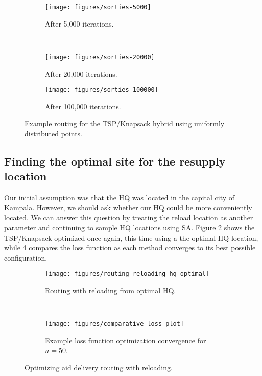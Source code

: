 \documentclass{article} %
\begin{document}
\begin{figure}[H]
  \centering
  \begin{subfigure}[b]{0.5\textwidth}
    \centering
    \texttt{[image: figures/sorties-5000]}
    \caption{After 5,000 iterations.}
  \end{subfigure}~\begin{subfigure}[b]{0.5\textwidth}
    \centering
    \texttt{[image: figures/sorties-20000]}
    \caption{After 20,000 iterations.}
  \end{subfigure}
  \begin{subfigure}[b]{\textwidth}
    \centering
    \texttt{[image: figures/sorties-100000]}
    \caption{After 100,000 iterations.}
  \end{subfigure}
  \caption{Example routing for the TSP/Knapsack hybrid using uniformly distributed points.}
  \label{fig:sorties}
\end{figure}

\subsection{Finding the optimal site for the resupply location}

Our initial assumption was that the HQ was located in the capital city of Kampala. However, we should ask whether our HQ could be more conveniently located. We can answer this question by treating the reload location as another parameter and continuing to sample HQ locations using SA. Figure \ref{fig:routing-reloading-hq-optimal} shows the TSP/Knapsack optimized once again, this time using a the optimal HQ location, while \ref{fig:comparative-loss-plot} compares the loss function as each method converges to its best possible configuration.

\begin{figure}
  \centering
  \begin{subfigure}[b]{0.5\columnwidth}
    \centering
    \texttt{[image: figures/routing-reloading-hq-optimal]}
    \caption{Routing with reloading from optimal HQ.}
    \label{fig:routing-reloading-hq-optimal}
  \end{subfigure}~\begin{subfigure}[b]{0.46\columnwidth}
    \centering
    \centering
    \texttt{[image: figures/comparative-loss-plot]}
    \caption{Example loss function optimization convergence for $n=50$.}
    \label{fig:comparative-loss-plot}
  \end{subfigure}
  \caption{Optimizing aid delivery routing with reloading.}
\end{figure}
\end{document}
